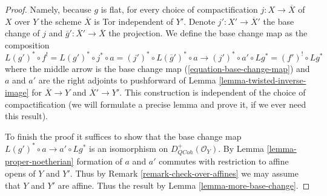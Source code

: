 \documentclass[10pt,a4paper]{amsart}
\theoremstyle{plain}
\theoremstyle{definition}
\theoremstyle{remark}
\numberwithin{equation}{subsection}
\def\QCoh{\mathit{QCoh}}
\begin{document}
\begin{proof}
Namely, because $g$ is flat, for every choice of
compactification $j : X \to \overline{X}$ of $X$ over $Y$
the scheme $\overline{X}$ is Tor independent of $Y'$.
Denote $j' : X' \to \overline{X}'$ the
base change of $j$ and $\overline{g}' : \overline{X}' \to \overline{X}$
the projection. We define the base change map as the composition
$$
L(g')^* \circ f^! = L(g')^* \circ j^* \circ a =
(j')^* \circ L(\overline{g}')^* \circ a \longrightarrow
(j')^* \circ a' \circ Lg^* = (f')^! \circ Lg^*
$$
where the middle arrow is the base change map
(\ref{equation-base-change-map})
and $a$ and $a'$ are the right adjoints to pushforward
of Lemma \ref{lemma-twisted-inverse-image}
for $\overline{X} \to Y$ and $\overline{X}' \to Y'$.
This construction is independent of the choice of
compactification (we will formulate a precise lemma
and prove it, if we ever need this result).

\medskip\noindent
To finish the proof it suffices to show that the base change
map $L(g')^* \circ a \to a' \circ Lg^*$ is an isomorphism
on $D_\QCoh^+(\mathcal{O}_Y)$.
By Lemma \ref{lemma-proper-noetherian} formation of $a$ and $a'$
commutes with restriction to affine opens of $Y$ and $Y'$.
Thus by Remark \ref{remark-check-over-affines}
we may assume that $Y$ and $Y'$ are affine.
Thus the result by Lemma \ref{lemma-more-base-change}.
\end{proof}
\end{document}
